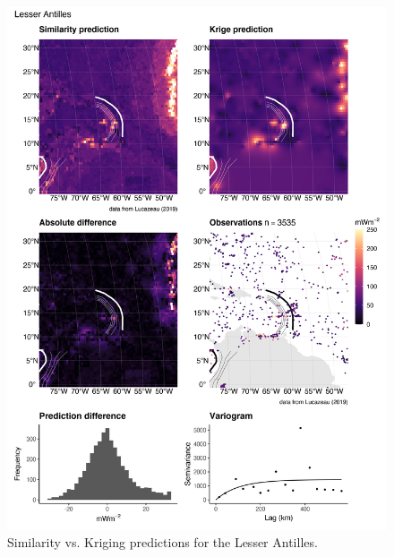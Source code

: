 \documentclass[draft,linenumbers]{agujournal2018}
\begin{document}
\begin{figure}[h]

{\centering \includegraphics[width=0.95\linewidth,]{../figs/diff/comp/Lesser_Antilles} 

}

\caption{Similarity vs. Kriging predictions for the Lesser Antilles.}\label{fig:lesser.antilles.comp}
\end{figure}
\end{document}
